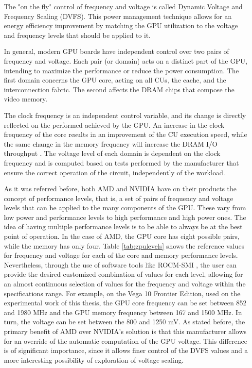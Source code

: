 The "on the fly" control of frequency and voltage is called Dynamic Voltage and Frequency Scaling (DVFS). This power management technique allows for an energy efficiency improvement by matching the GPU utilization to the voltage and frequency levels that should be applied to it.

In general, modern GPU boards have independent control over two pairs of frequency and voltage. Each pair (or domain) acts on a distinct part of the GPU, intending to maximize the performance or reduce the power consumption. The first domain concerns the GPU core, acting on all CUs, the cache, and the interconnection fabric. The second affects the DRAM chips that compose the video memory. 

The clock frequency is an independent control variable, and its change is directly reflected on the performed achieved by the GPU. An increase in the clock frequency of the core results in an improvement of the CU execution speed, while the same change in the memory frequency will increase the DRAM I/O throughput \cite{mei_survey_2016}. The voltage level of each domain is dependent on the clock frequency and is computed based on tests performed by the manufacturer that ensure the correct operation of the circuit, independently of the workload.

As it was referred before, both AMD and NVIDIA have on their products the concept of performance levels, that is, a set of pairs of frequency and voltage levels that can be applied to the many components of the GPU. These vary from low power and performance levels to high performance and high power ones. The idea of having multiple performance levels is to be able to always be at the best point of operation.  In the case of AMD, the GPU core has eight possible pairs, while the memory has only four. Table \ref{tab:gpulevels} shows the reference values for frequency and voltage for each of the core and memory performance levels. Nevertheless, through the use of software tools like ROCM-SMI \cite{noauthor_radeonopencompute/roc-smi_2019}, the user can provide the desired customized combination of values for each level, allowing for an almost continuous selection of values for the frequency and voltage within the specifications range. For example, on the Vega 10 Frontier Edition, used on the experimental work of this thesis, the GPU core frequency can be set between 852 and 1980 MHz and the GPU memory frequency between 167 and 1500 MHz. In turn, the voltage can be set between the 800 and 1250 mV. As stated before, the primary benefit of AMD over NVIDIA's solution is that this manufacturer allows for an override of the automatic computation of the GPU voltage. This difference is of significant importance, since it allows finer control of the DVFS values and a more interesting possibility of exploration of voltage scaling.



